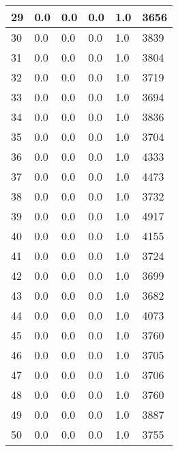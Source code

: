 \begin{longtable}{|l|l|l|l|l|l|}
29 & 0.0 & 0.0 & 0.0 & 1.0 & 3656 \\ \hline 
30 & 0.0 & 0.0 & 0.0 & 1.0 & 3839 \\ \hline 
31 & 0.0 & 0.0 & 0.0 & 1.0 & 3804 \\ \hline 
32 & 0.0 & 0.0 & 0.0 & 1.0 & 3719 \\ \hline 
33 & 0.0 & 0.0 & 0.0 & 1.0 & 3694 \\ \hline 
34 & 0.0 & 0.0 & 0.0 & 1.0 & 3836 \\ \hline 
35 & 0.0 & 0.0 & 0.0 & 1.0 & 3704 \\ \hline 
36 & 0.0 & 0.0 & 0.0 & 1.0 & 4333 \\ \hline 
37 & 0.0 & 0.0 & 0.0 & 1.0 & 4473 \\ \hline 
38 & 0.0 & 0.0 & 0.0 & 1.0 & 3732 \\ \hline 
39 & 0.0 & 0.0 & 0.0 & 1.0 & 4917 \\ \hline 
40 & 0.0 & 0.0 & 0.0 & 1.0 & 4155 \\ \hline 
41 & 0.0 & 0.0 & 0.0 & 1.0 & 3724 \\ \hline 
42 & 0.0 & 0.0 & 0.0 & 1.0 & 3699 \\ \hline 
43 & 0.0 & 0.0 & 0.0 & 1.0 & 3682 \\ \hline 
44 & 0.0 & 0.0 & 0.0 & 1.0 & 4073 \\ \hline 
45 & 0.0 & 0.0 & 0.0 & 1.0 & 3760 \\ \hline 
46 & 0.0 & 0.0 & 0.0 & 1.0 & 3705 \\ \hline 
47 & 0.0 & 0.0 & 0.0 & 1.0 & 3706 \\ \hline 
48 & 0.0 & 0.0 & 0.0 & 1.0 & 3760 \\ \hline 
49 & 0.0 & 0.0 & 0.0 & 1.0 & 3887 \\ \hline 
50 & 0.0 & 0.0 & 0.0 & 1.0 & 3755 \\ \hline 
\end{longtable}
